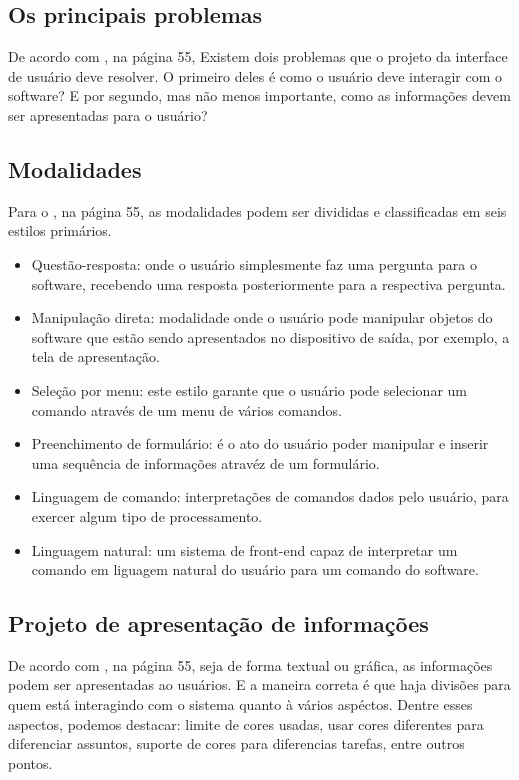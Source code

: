 \subsection[Os principais problemas]{Os principais problemas}
De acordo com \cite{swebok}, na página 55, Existem dois problemas que o projeto da interface de usuário deve resolver. O
primeiro deles é como o usuário deve interagir com o software? E por segundo, mas
não menos importante, como as informações devem ser apresentadas para o usuário?

\subsection[Modalidade]{Modalidades}
Para o \cite{swebok}, na página 55, as modalidades podem ser divididas e classificadas em seis estilos primários.

\begin{itemize}
    \item Questão-resposta: onde o usuário simplesmente faz uma pergunta para o
        software, recebendo uma resposta posteriormente para a respectiva pergunta.

    \item Manipulação direta: modalidade onde o usuário pode manipular objetos
        do software que estão sendo apresentados no dispositivo de saída, por
        exemplo, a tela de apresentação.

    \item Seleção por menu: este estilo garante que o usuário pode selecionar um
        comando através de um menu de vários comandos.

    \item Preenchimento de formulário: é o ato do usuário poder manipular e inserir
        uma sequência de informações atravéz de um formulário.

    \item Linguagem de comando: interpretações de comandos dados pelo usuário,
        para exercer algum tipo de processamento.

    \item Linguagem natural: um sistema de front-end capaz de interpretar um
        comando em liguagem natural do usuário para um comando do software.
\end{itemize}

\subsection[Projeto de apresentação de informações]{Projeto de apresentação de informações}
De acordo com \cite{swebok}, na página 55, seja de forma textual ou gráfica, as informações podem
ser apresentadas ao usuários. E a maneira correta é que haja divisões para quem
está interagindo com o sistema quanto à vários aspéctos. Dentre esses aspectos,
podemos destacar: limite de cores usadas, usar cores diferentes para diferenciar
assuntos, suporte de cores para diferencias tarefas, entre outros pontos.

